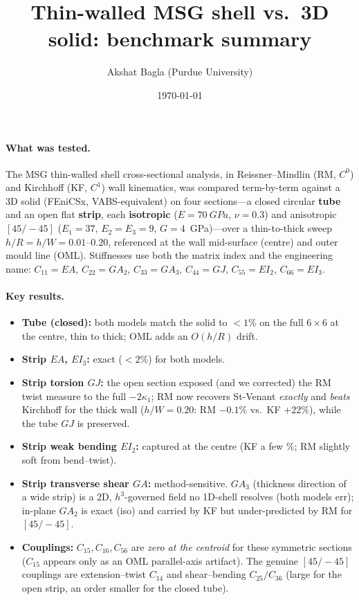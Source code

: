 \documentclass[11pt]{article}
\title{\textbf{Thin-walled MSG shell vs.\ 3D solid: benchmark summary}}
\author{Akshat Bagla \quad\small (Purdue University)}
\date{\today}
\begin{document}
\maketitle
\vspace{-2.5em}

\paragraph{What was tested.} The MSG thin-walled shell cross-sectional analysis,
in Reissner--Mindlin (RM, $C^0$) and Kirchhoff (KF, $C^1$) wall kinematics, was
compared term-by-term against a 3D solid (FEniCSx, VABS-equivalent) on four
sections---a closed circular \textbf{tube} and an open flat \textbf{strip}, each
\textbf{isotropic} ($E=\SI{70}{GPa}$, $\nu=0.3$) and anisotropic
\textbf{$[45/\!-\!45]$} ($E_1{=}37$, $E_2{=}E_3{=}9$, $G{=}4$~GPa)---over a
thin-to-thick sweep $h/R=h/W=0.01$--$0.20$, referenced at the wall mid-surface
(centre) and outer mould line (OML). Stiffnesses use both the matrix index and
the engineering name: $C_{11}{=}EA$, $C_{22}{=}GA_2$, $C_{33}{=}GA_3$,
$C_{44}{=}GJ$, $C_{55}{=}EI_2$, $C_{66}{=}EI_3$.

\paragraph{Key results.}
\begin{itemize}\setlength\itemsep{1pt}
\item \textbf{Tube (closed):} both models match the solid to $<1\%$ on the full
$6\times6$ at the centre, thin to thick; OML adds an $O(h/R)$ drift.
\item \textbf{Strip $EA$, $EI_3$:} exact ($<2\%$) for both models.
\item \textbf{Strip torsion $GJ$:} the open section exposed (and we corrected) the
RM twist measure to the full $-2\kappa_1$; RM now recovers St-Venant
\emph{exactly} and \emph{beats} Kirchhoff for the thick wall ($h/W{=}0.20$: RM
$-0.1\%$ vs.\ KF $+22\%$), while the tube $GJ$ is preserved.
\item \textbf{Strip weak bending $EI_2$:} captured at the centre (KF a few \%; RM
slightly soft from bend--twist).
\item \textbf{Strip transverse shear $GA$:} method-sensitive. $GA_3$ (thickness
direction of a wide strip) is a 2D, $h^3$-governed field no 1D-shell resolves
(both models err); in-plane $GA_2$ is exact (iso) and carried by KF but
under-predicted by RM for $[45/\!-\!45]$.
\item \textbf{Couplings:} $C_{15},C_{16},C_{56}$ are \emph{zero at the centroid}
for these symmetric sections ($C_{15}$ appears only as an OML parallel-axis
artifact). The genuine $[45/\!-\!45]$ couplings are extension--twist $C_{14}$ and
shear--bending $C_{25}/C_{36}$ (large for the open strip, an order smaller for the
closed tube).
\end{itemize}
\end{document}
